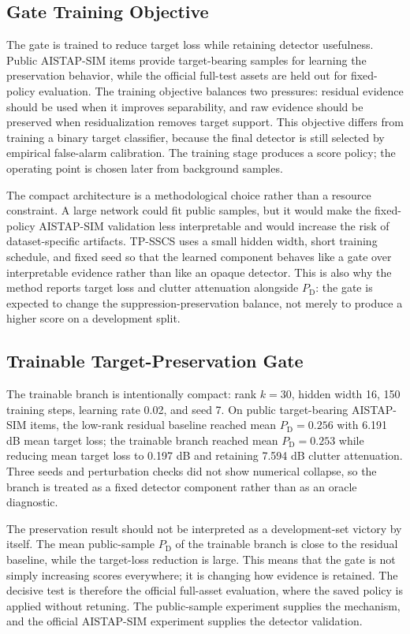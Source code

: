 \documentclass[journal]{IEEEtran}
\begin{document}
\subsection{Gate Training Objective}

The gate is trained to reduce target loss while retaining detector usefulness. Public AISTAP-SIM items provide target-bearing samples for learning the preservation behavior, while the official full-test assets are held out for fixed-policy evaluation. The training objective balances two pressures: residual evidence should be used when it improves separability, and raw evidence should be preserved when residualization removes target support. This objective differs from training a binary target classifier, because the final detector is still selected by empirical false-alarm calibration. The training stage produces a score policy; the operating point is chosen later from background samples.

The compact architecture is a methodological choice rather than a resource constraint. A large network could fit public samples, but it would make the fixed-policy AISTAP-SIM validation less interpretable and would increase the risk of dataset-specific artifacts. TP-SSCS uses a small hidden width, short training schedule, and fixed seed so that the learned component behaves like a gate over interpretable evidence rather than like an opaque detector. This is also why the method reports target loss and clutter attenuation alongside $P_{\mathrm{D}}$: the gate is expected to change the suppression-preservation balance, not merely to produce a higher score on a development split.

\subsection{Trainable Target-Preservation Gate}

The trainable branch is intentionally compact: rank $k=30$, hidden width 16, 150 training steps, learning rate 0.02, and seed 7. On public target-bearing AISTAP-SIM items, the low-rank residual baseline reached mean $P_{\mathrm{D}}=0.256$ with 6.191 dB mean target loss; the trainable branch reached mean $P_{\mathrm{D}}=0.253$ while reducing mean target loss to 0.197 dB and retaining 7.594 dB clutter attenuation. Three seeds and perturbation checks did not show numerical collapse, so the branch is treated as a fixed detector component rather than as an oracle diagnostic.

The preservation result should not be interpreted as a development-set victory by itself. The mean public-sample $P_{\mathrm{D}}$ of the trainable branch is close to the residual baseline, while the target-loss reduction is large. This means that the gate is not simply increasing scores everywhere; it is changing how evidence is retained. The decisive test is therefore the official full-asset evaluation, where the saved policy is applied without retuning. The public-sample experiment supplies the mechanism, and the official AISTAP-SIM experiment supplies the detector validation.
\end{document}

